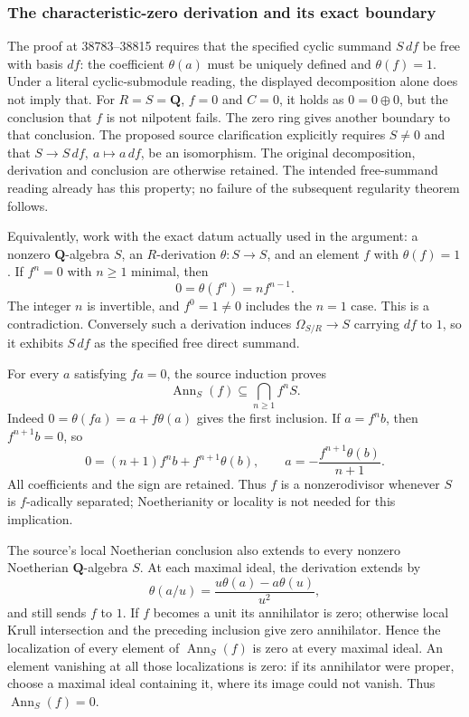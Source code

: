 \subsubsection{The characteristic-zero derivation and its exact boundary}\label{the-characteristic-zero-derivation-and-its-exact-boundary}

The proof at 38783--38815 requires that the specified cyclic summand \(S\,df\) be free with basis \(df\): the coefficient \(\theta(a)\) must be uniquely defined and \(\theta(f)=1\). Under a literal cyclic-submodule reading, the displayed decomposition alone does not imply that. For \(R=S=\mathbf Q\), \(f=0\) and \(C=0\), it holds as \(0=0\oplus0\), but the conclusion that \(f\) is not nilpotent fails. The zero ring gives another boundary to that conclusion. The proposed source clarification explicitly requires \(S\ne0\) and that \(S\to S\,df,\ a\mapsto a\,df\), be an isomorphism. The original decomposition, derivation and conclusion are otherwise retained. The intended free-summand reading already has this property; no failure of the subsequent regularity theorem follows.

Equivalently, work with the exact datum actually used in the argument: a nonzero \(\mathbf Q\)-algebra \(S\), an \(R\)-derivation \(\theta:S\to S\), and an element \(f\) with \(\theta(f)=1\). If \(f^n=0\) with \(n\ge1\) minimal, then \[
0=\theta(f^n)=n f^{n-1}.
\] The integer \(n\) is invertible, and \(f^0=1\ne0\) includes the \(n=1\) case. This is a contradiction. Conversely such a derivation induces \(\Omega_{S/R}\to S\) carrying \(df\) to \(1\), so it exhibits \(S\,df\) as the specified free direct summand.

For every \(a\) satisfying \(fa=0\), the source induction proves \[
\operatorname{Ann}_S(f)\subseteq\bigcap_{n\ge1}f^nS.
\] Indeed \(0=\theta(fa)=a+f\theta(a)\) gives the first inclusion. If \(a=f^n b\), then \(f^{n+1}b=0\), so \[
0=(n+1)f^n b+f^{n+1}\theta(b),\qquad
a=-\frac{f^{n+1}\theta(b)}{n+1}.
\] All coefficients and the sign are retained. Thus \(f\) is a nonzerodivisor whenever \(S\) is \(f\)-adically separated; Noetherianity or locality is not needed for this implication.

The source's local Noetherian conclusion also extends to every nonzero Noetherian \(\mathbf Q\)-algebra \(S\). At each maximal ideal, the derivation extends by \[
\theta(a/u)=\frac{u\theta(a)-a\theta(u)}{u^2},
\] and still sends \(f\) to \(1\). If \(f\) becomes a unit its annihilator is zero; otherwise local Krull intersection and the preceding inclusion give zero annihilator. Hence the localization of every element of \(\operatorname{Ann}_S(f)\) is zero at every maximal ideal. An element vanishing at all those localizations is zero: if its annihilator were proper, choose a maximal ideal containing it, where its image could not vanish. Thus \(\operatorname{Ann}_S(f)=0\).

